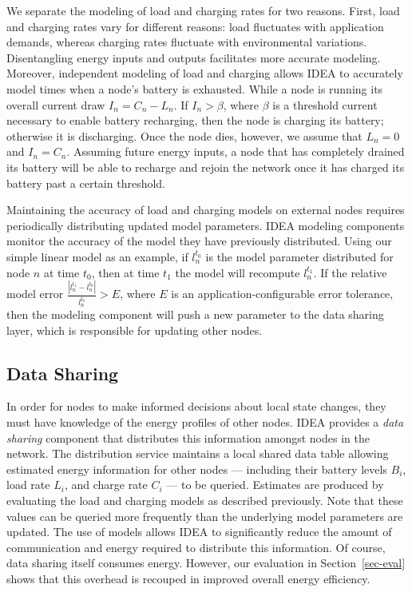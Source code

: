 We separate the modeling of load and charging rates for two reasons. First,
load and charging rates vary for different reasons: load fluctuates with
application demands, whereas charging rates fluctuate with environmental
variations. Disentangling energy inputs and outputs facilitates more accurate
modeling. Moreover, independent modeling of load and charging allows IDEA to
accurately model times when a node's battery is exhausted. While a node is
running its overall current draw $I_n = C_n - L_n$. If $I_n > \beta$, where
$\beta$ is a threshold current necessary to enable battery recharging, then
the node is charging its battery; otherwise it is discharging. Once the node
dies, however, we assume that $L_n = 0$ and $I_n = C_n$. Assuming future
energy inputs, a node that has completely drained its battery will be able to
recharge and rejoin the network once it has charged its battery past a
certain threshold.

Maintaining the accuracy of load and charging models on external nodes
requires periodically distributing updated model parameters. IDEA modeling
components monitor the accuracy of the model they have previously
distributed. Using our simple linear model as an example, if $l_n^{t_0}$ is
the model parameter distributed for node $n$ at time $t_0$, then at time
$t_1$ the model will recompute $l_n^{t_1}$. If the relative model error
$\frac{\left| l_n^{t_1} - l_n^{t_0} \right|}{l_n^{t_0}} > E$, where $E$ is an
application-configurable error tolerance, then the modeling component will
push a new parameter to the data sharing layer, which is responsible for
updating other nodes. 

\subsection{Data Sharing}

In order for nodes to make informed decisions about local state changes, they
must have knowledge of the energy profiles of other nodes. IDEA provides a
\textit{data sharing} component that distributes this information amongst
nodes in the network. The distribution service maintains a local shared data
table allowing estimated energy information for other nodes --- including
their battery levels $B_i$, load rate $L_i$, and charge rate $C_i$ --- to be
queried. Estimates are produced by evaluating the load and charging models as
described previously. Note that these values can be queried more frequently
than the underlying model parameters are updated. The use of models allows
IDEA to significantly reduce the amount of communication and energy required
to distribute this information. Of course, data sharing itself consumes
energy. However, our evaluation in Section~\ref{sec-eval} shows that this
overhead is recouped in improved overall energy efficiency. 

